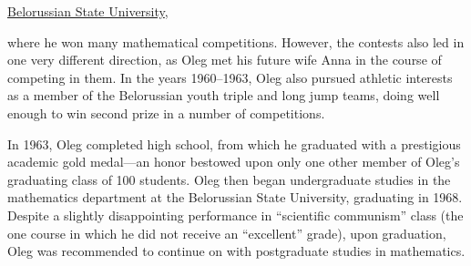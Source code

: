\href{http://www.bsu.by/en/main.aspx}{Belorussian State University}, 

where he won many mathematical competitions. However, the contests also led in one very different direction, as Oleg met his future wife Anna in the course of competing in them. In the years 1960–1963, Oleg also pursued athletic interests as a member of the Belorussian youth triple and long jump teams, doing well enough to win second prize in a number of competitions.



In 1963, Oleg completed high school, from which he graduated with a prestigious academic gold medal—an honor bestowed upon only one other member of Oleg's graduating class of 100 students. Oleg then began undergraduate studies in the mathematics department at the Belorussian State University, graduating in 1968. Despite a slightly disappointing performance in ``scientific communism'' class (the one course in which he did not receive an ``excellent'' grade), upon graduation, Oleg was recommended to continue on with postgraduate studies in mathematics. 





\smallskip









